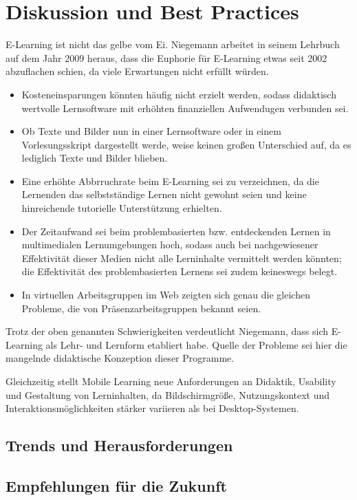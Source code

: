 \chapter{Diskussion und Best Practices}

E-Learning ist nicht das gelbe vom Ei\label{elearning}. Niegemann arbeitet in seinem Lehrbuch auf dem Jahr 2009 heraus, dass die Euphorie für E-Learning etwas seit 2002 abzuflachen schien, da viele Erwartungen nicht erfüllt würden.\parencite[S.~14]{niegemann_kompendium_2008}

\begin{itemize}
	\item Kosteneinsparungen könnten häufig nicht erzielt werden, sodass didaktisch wertvolle Lernsoftware mit erhöhten finanziellen Aufwendugen verbunden sei.
	\item Ob Texte und Bilder nun in einer Lernsoftware oder in einem Vorlesungsskript dargestellt werde, weise keinen großen Unterschied auf, da es lediglich Texte und Bilder blieben.
	\item Eine erhöhte Abbrruchrate beim E-Learning sei zu verzeichnen, da die Lernenden das selbstständige Lernen nicht gewohnt seien und keine hinreichende tutorielle Unterstützung erhielten.
	\item Der Zeitaufwand sei beim problembasierten bzw. entdeckenden Lernen in multimedialen Lernumgebungen hoch, sodass auch bei nachgewiesener Effektivität dieser Medien nicht alle Lerninhalte vermittelt werden könnten; die Effektivität des problembasierten Lernens sei zudem keineswegs belegt.
	\item In virtuellen Arbeitsgruppen im Web zeigten sich genau die gleichen Probleme, die von Präsenzarbeitsgruppen bekannt seien.
\end{itemize}

Trotz der oben genannten Schwierigkeiten verdeutlicht Niegemann, dass sich E-Learning als Lehr- und Lernform etabliert habe. Quelle der Probleme sei hier die mangelnde didaktische Konzeption dieser Programme.\parencite[S.~14]{niegemann_kompendium_2008}

Gleichzeitig stellt Mobile Learning neue Anforderungen an Didaktik, Usability und Gestaltung von Lerninhalten, da Bildschirmgröße, Nutzungskontext und Interaktionsmöglichkeiten stärker variieren als bei Desktop-Systemen.

\section{Trends und Herausforderungen}

\section{Empfehlungen für die Zukunft}
